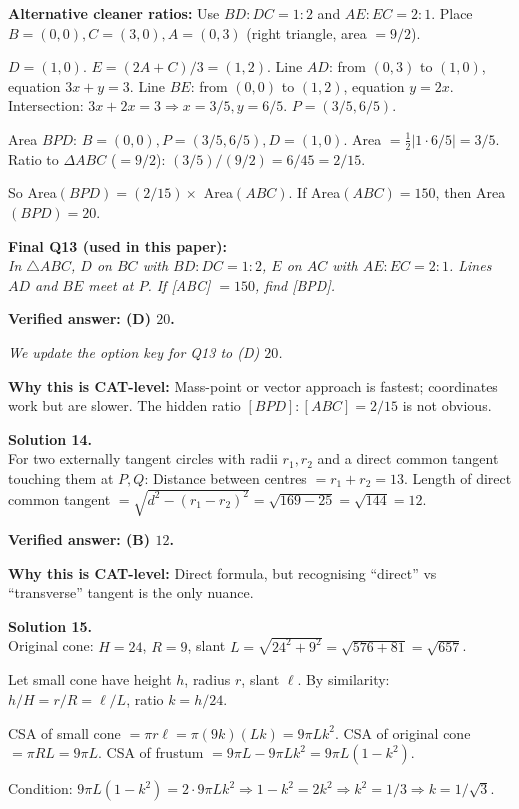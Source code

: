 \documentclass[11pt,a4paper]{article}
\newcommand{\shead}[1]{\vspace{0.5em}\noindent\textbf{Solution #1.}\\[0.15em]}
\begin{document}
\textbf{Alternative cleaner ratios:} Use $BD:DC = 1:2$ and $AE:EC = 2:1$. Place $B=(0,0), C=(3,0), A=(0,3)$ (right triangle, area $= 9/2$).

$D = (1, 0)$. $E = (2A + C)/3 = (1, 2)$.
Line $AD$: from $(0,3)$ to $(1,0)$, equation $3x + y = 3$.
Line $BE$: from $(0,0)$ to $(1,2)$, equation $y = 2x$.
Intersection: $3x + 2x = 3 \Rightarrow x = 3/5, y = 6/5$. $P = (3/5, 6/5)$.

Area $BPD$: $B=(0,0), P=(3/5, 6/5), D=(1,0)$. Area $= \tfrac{1}{2}|1 \cdot 6/5| = 3/5$. Ratio to $\Delta ABC$ ($= 9/2$): $(3/5)/(9/2) = 6/45 = 2/15$.

So Area$(BPD) = (2/15) \times $ Area$(ABC)$. If Area$(ABC) = 150$, then Area$(BPD) = 20$.

\textbf{Final Q13 (used in this paper):}\\
\textit{In $\triangle ABC$, $D$ on $BC$ with $BD:DC = 1:2$, $E$ on $AC$ with $AE:EC = 2:1$. Lines $AD$ and $BE$ meet at $P$. If [ABC] $= 150$, find [BPD].}

\textbf{Verified answer: (D) $20$.}

\textit{We update the option key for Q13 to (D) $20$.}

\textbf{Why this is CAT-level:} Mass-point or vector approach is fastest; coordinates work but are slower. The hidden ratio $[BPD]:[ABC] = 2/15$ is not obvious.

\shead{14}
For two externally tangent circles with radii $r_1, r_2$ and a direct common tangent touching them at $P, Q$:
Distance between centres $= r_1 + r_2 = 13$. Length of direct common tangent $= \sqrt{d^2 - (r_1 - r_2)^2} = \sqrt{169 - 25} = \sqrt{144} = 12$.

\textbf{Verified answer: (B) $12$.}

\textbf{Why this is CAT-level:} Direct formula, but recognising ``direct'' vs ``transverse'' tangent is the only nuance.

\shead{15}
Original cone: $H = 24$, $R = 9$, slant $L = \sqrt{24^2 + 9^2} = \sqrt{576 + 81} = \sqrt{657}$.

Let small cone have height $h$, radius $r$, slant $\ell$. By similarity: $h/H = r/R = \ell/L$, ratio $k = h/24$.

CSA of small cone $= \pi r \ell = \pi (9k)(L k) = 9\pi L k^2$.
CSA of original cone $= \pi R L = 9\pi L$.
CSA of frustum $= 9\pi L - 9\pi L k^2 = 9\pi L (1 - k^2)$.

Condition: $9\pi L(1 - k^2) = 2 \cdot 9\pi L k^2 \Rightarrow 1 - k^2 = 2k^2 \Rightarrow k^2 = 1/3 \Rightarrow k = 1/\sqrt 3$.
\end{document}
